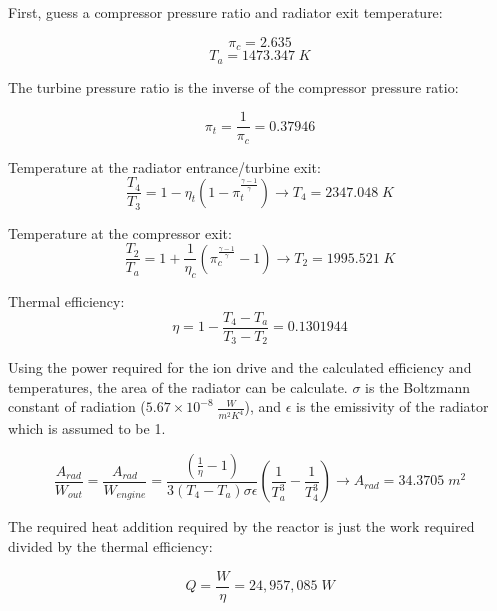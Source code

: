 \documentclass[journal ]{new-aiaa}
\begin{document}
\noindent First, guess a compressor pressure ratio and radiator exit temperature:

\begin{equation*}
    \pi_c = \boxed{2.635}
\end{equation*}
\begin{equation*}
    T_a = \boxed{1473.347\;K}
\end{equation*}

\noindent The turbine pressure ratio is the inverse of the compressor pressure ratio:

\begin{equation}
    \pi_t = \frac{1}{\pi_c} = 0.37946
\end{equation}

\noindent Temperature at the radiator entrance/turbine exit:
\begin{equation}
    \frac{T_4}{T_3} = 1-\eta_t \left(1-\pi_t^{\frac{\gamma-1}{\gamma}}\right)
    \rightarrow T_4 = \boxed{2347.048\;K}
\end{equation}

\noindent Temperature at the compressor exit:
\begin{equation}
    \frac{T_2}{T_a} = 1+\frac{1}{\eta_c} \left(\pi_c^{\frac{\gamma-1}{\gamma}}-1\right)
    \rightarrow T_2 = \boxed{1995.521\;K}
\end{equation}

\noindent Thermal efficiency:
\begin{equation}
    \eta = 1 - \frac{T_4 - T_a}{T_3 - T_2} = \boxed{0.1301944}
\end{equation}

Using the power required for the ion drive and the calculated efficiency and temperatures, the area of the radiator can be calculate.
$\sigma$ is the Boltzmann constant of radiation ($5.67\times10^{-8}\; \frac{W}{m^2 K^4}$), and $\epsilon$ is the emissivity of the radiator which is assumed to be 1.

\begin{equation}
    \frac{A_{rad}}{W_{out}} = \frac{A_{rad}}{W_{engine}} =
    \frac{\left(\frac{1}{\eta} - 1\right)}{3(T_4 - T_a)\sigma \epsilon}
    \left(\frac{1}{T_a^3} - \frac{1}{T_4^3}\right)
    \rightarrow A_{rad} = \boxed{34.3705\;m^2}
\end{equation}

\noindent The required heat addition required by the reactor is just the work required divided by the thermal efficiency:

\begin{equation}
    Q = \frac{W}{\eta} = \boxed{24,957,085\;W}
\end{equation}
\end{document}
